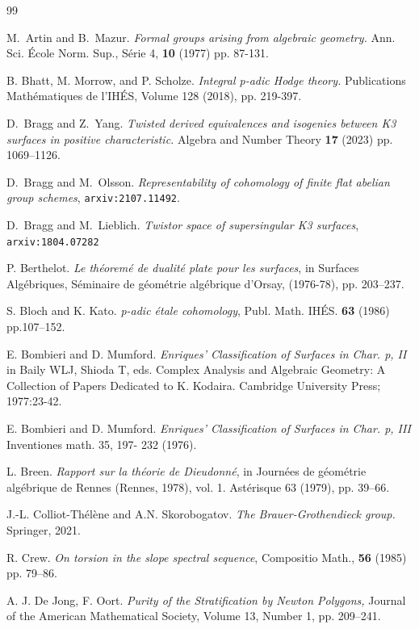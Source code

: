\documentclass[a4paper,12pt,twoside]{report}
\begin{document}
\begin{thebibliography}{99}
 
     M.~Artin and B.~Mazur. \emph{Formal groups arising from algebraic geometry.} Ann. Sci. École Norm. Sup., S\'erie 4, {\bf 10} (1977) pp. 87-131.

     B. Bhatt, M. Morrow, and P. Scholze. \emph{Integral p-adic Hodge theory.} Publications Mathématiques de l'IHÉS, Volume 128 (2018), pp. 219-397.
 
     D.~Bragg and Z.~Yang. \emph{Twisted derived equivalences and isogenies 
    between K3 surfaces in positive characteristic.}
    Algebra and Number Theory {\bf 17} (2023) pp. 1069--1126.
    
     D.~Bragg and M.~Olsson. \emph{Representability of cohomology of finite flat abelian group schemes}, \texttt{arxiv:2107.11492}.
    
     D.~Bragg and M.~Lieblich. \emph{Twistor space of supersingular K3 surfaces}, \texttt{arxiv:1804.07282}
    
     P. Berthelot. \emph{Le th\'eorem\'e de dualit\'e plate pour les surfaces}, in Surfaces Alg\'ebriques, Séminaire de géométrie algébrique d'Orsay, (1976-78), pp. 203--237.
 
     S. Bloch and K. Kato. \emph{p-adic \'etale cohomology}, Publ. Math. IH\'ES. {\bf 63} (1986) pp.107--152.
    
     E. Bombieri and D. Mumford. \emph{Enriques' Classification of Surfaces in Char. p, II} in Baily WLJ, Shioda T, eds. Complex Analysis and Algebraic Geometry: A Collection of Papers Dedicated to K. Kodaira. Cambridge University Press; 1977:23-42.

     E. Bombieri and D. Mumford. \emph{Enriques' Classification of Surfaces in Char. p, III} Inventiones math. 35, 197- 232 (1976).

     L. Breen. \emph{Rapport sur la th\'eorie de Dieudonn\'e}, in Journ\'ees de g\'eom\'etrie alg\'ebrique de Rennes (Rennes, 1978), vol. 1. Astérisque 63 (1979), pp. 39--66. 

     J.-L. Colliot-Th\'el\`ene and A.N. Skorobogatov. \emph{The Brauer-Grothendieck group.} Springer, 2021.

     R. Crew. \emph{On torsion in the slope spectral sequence}, Compositio Math., {\bf 56} (1985) pp. 79--86.

      A. J. De Jong, F. Oort. \emph{Purity of the Stratification by Newton Polygons,} Journal of the American Mathematical Society, Volume 13, Number 1, pp. 209--241.


\end{thebibliography}
\end{document}
